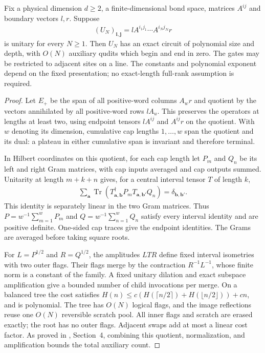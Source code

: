 \begin{lemma}
    \label{thm:mpu_uniform_averaged_boundary_circuits}
    Fix a physical dimension $d\geq2$, a finite-dimensional bond space,
    matrices $A^{ij}$ and boundary vectors $l,r$. Suppose
    \begin{align}
        (U_N)_{\mathbf i,\mathbf j}
        =lA^{i_1j_1}\cdots A^{i_Nj_N}r
    \end{align}
    is unitary for every $N\geq1$. Then $U_N$ has an exact circuit
    of polynomial size and depth, with $O(N)$ auxiliary qudits which
    begin and end in zero. The gates may be restricted to adjacent
    sites on a line. The constants and polynomial exponent depend
    on the fixed presentation; no exact-length full-rank assumption
    is required.
\end{lemma}
\begin{proof}
    Let $E_+$ be the span of all positive-word columns $A_wr$ and
    quotient by the vectors annihilated by all positive-word rows
    $lA_u$. This preserves the operators at lengths at least two,
    using endpoint tensors $lA^{ij}$ and $A^{ij}r$ on the quotient.
    With $w$ denoting its dimension, cumulative cap lengths $1,\ldots,w$
    span the quotient and its dual: a plateau in either cumulative
    span is invariant and therefore terminal.

    In Hilbert coordinates on this quotient, for each cap length
    let $P_m$ and $Q_n$ be its left and right Gram matrices, with
    cap inputs averaged and cap outputs summed. Unitarity at length
    $m+k+n$ gives, for a central interval tensor $T$ of length $k$,
    \begin{align}
        \sum_{\mathbf a}\operatorname{Tr}
        (T_{\mathbf a,\mathbf b}^\dagger P_m
        T_{\mathbf a,\mathbf b'}Q_n)
        =\delta_{\mathbf b,\mathbf b'}.
    \end{align}
    This identity is separately linear in the two Gram matrices.
    Thus $P=w^{-1}\sum_{m=1}^wP_m$ and
    $Q=w^{-1}\sum_{n=1}^wQ_n$ satisfy every interval identity and
    are positive definite. One-sided cap traces give the endpoint
    identities. The Grams are averaged before taking square roots.

    For $L=P^{1/2}$ and $R=Q^{1/2}$, the amplitudes $LTR$ define
    fixed interval isometries with two outer flags. Their flags merge
    by the contraction $R^{-1}L^{-1}$, whose finite norm is a constant
    of the family. A fixed unitary dilation and exact subspace
    amplification give a bounded number of child invocations per
    merge. On a balanced tree the cost satisfies
    $H(n)\leq c(H(\lceil n/2\rceil)+H(\lfloor n/2\rfloor))+cn$,
    and is polynomial. The tree has $O(N)$ logical flags, and the
    image reflections reuse one $O(N)$ reversible scratch pool.
    All inner flags and scratch are erased exactly; the root has
    no outer flags. Adjacent swaps add at most a linear cost factor.
    As proved in \cite{RankTwoMPUCircuits2026}, Section~4, combining
    this quotient, normalization, and amplification bounds the total auxiliary count.
\end{proof}

